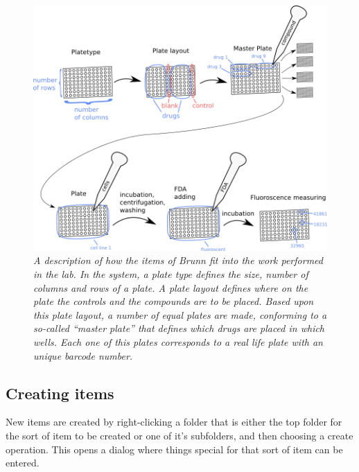 \documentclass[a4paper,10pt]{article}
\begin{document}
        \begin{figure}[htbp]
            \begin{center}
                \includegraphics[width=1\textwidth]{images/labWork.png}
            \end{center}
            \caption{\textit{A description of how the items of Brunn fit into
                             the work performed in the lab. In the system, a
                             plate type defines the size, number of columns and
                             rows of a plate. A plate layout defines where on
                             the plate the controls and the compounds are to be
                             placed. Based upon this plate layout, a number of
                             equal plates are made, conforming to a so-called
                             “master plate” that defines which drugs are placed
                             in which wells. Each one of this plates corresponds
                             to a real life plate with an unique barcode
                             number. }}
            \label{labWork}
        \end{figure}

        \subsection{Creating items}
            New items are created by right-clicking a folder that is either the
            top folder for the sort of item to be created or one of it's
            subfolders, and then choosing a create operation. This opens a
            dialog where things special for that sort of item can be entered. 
\end{document}
